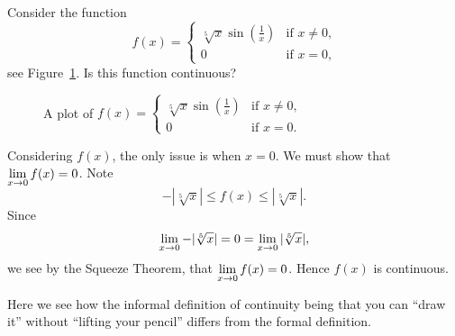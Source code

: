 \begin{example}
Consider the function
\[
f(x) = 
\begin{cases}
\sqrt[5]{x}\sin\left(\frac{1}{x}\right) & \text{if $x \ne 0$,}\\
0 & \text{if $x = 0$,}
\end{cases}
\]
see Figure~\ref{plot:sqrt[5]xsin 1/x}. Is this function continuous? \cite{mooc}

\begin{figure}[H]
    \centering
    \caption[A continuous function.]{A plot of
$
f(x)=
\begin{cases}
\sqrt[5]{x}\sin\left(\frac{1}{x}\right) & \text{if $x \ne 0$,}\\
 0 & \text{if $x = 0$.}
\end{cases}
$
}
    \label{plot:sqrt[5]xsin 1/x}
\end{figure}

    \begin{solution}
    Considering $f(x)$, the only issue is when $x=0$. We must show that
    $\displaystyle\lim\limits_{x\to 0} f(x) = 0$. Note
    \[
    -|\sqrt[5]{x}|\le f(x) \le |\sqrt[5]{x}|.
    \]
    Since
    \[
    \displaystyle\lim\limits_{x\to 0} -|\sqrt[5]{x}| = 0 = \displaystyle\lim\limits_{x\to 0}|\sqrt[5]{x}|,
    \]
    we see by the Squeeze Theorem, that
    $\displaystyle\lim\limits_{x\to 0} f(x) = 0$. Hence $f(x)$ is continuous.

    Here we see how the informal definition of continuity being that you
    can ``draw it'' without ``lifting your pencil'' differs from the
    formal definition.
    \end{solution}

\end{example}


